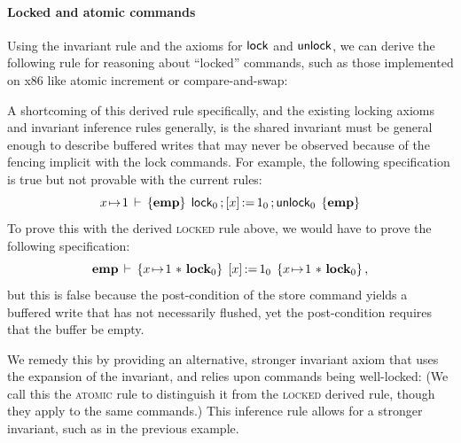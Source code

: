 \documentclass[11pt]{report}         %
\begin{document}


\paragraph{Locked and atomic commands} Using the invariant rule and the axioms for $\operatorname{\mathsf{lock}}$ and $\operatorname{\mathsf{unlock}}$, we can derive the following rule for reasoning about ``locked'' commands, such as those implemented on x86 like atomic increment or compare-and-swap:  

A shortcoming of this derived rule specifically, and the existing locking axioms and invariant inference rules generally, is the shared invariant must be general enough to describe buffered writes that may never be observed because of the fencing implicit with the lock commands. For example, the following specification is true but not provable with the current rules:     \[ x \!\mapsto\! 1\,\vdash\,\left\lbrace \mathbf{emp} \right\rbrace\;\operatorname{\mathsf{lock}}_0 \operatorname{;} \left[ x \right] \operatorname{:\!=} 1_0 \operatorname{;} \operatorname{\mathsf{unlock}}_0\;\left\lbrace \mathbf{emp} \right\rbrace \] To prove this with the derived \textsc{locked} rule above, we would have to prove the following specification: \[ \mathbf{emp}\,\vdash\,\left\lbrace x \!\mapsto\! 1 \operatorname{\,\ast\,} \mathbf{lock}_{0} \right\rbrace\;\left[ x \right] \operatorname{:\!=} 1_0\;\left\lbrace x \!\mapsto\! 1 \operatorname{\,\ast\,} \mathbf{lock}_{0} \right\rbrace,\] but this is false because the post-condition of the store command yields a buffered write that has not necessarily flushed, yet the post-condition requires that the buffer be empty. 

We remedy this by providing an alternative, stronger invariant axiom that uses the expansion of the invariant, and relies upon commands being well-locked:  (We call this the \textsc{atomic} rule to distinguish it from the \textsc{locked} derived rule, though they apply to the same commands.) This inference rule allows for a stronger invariant, such as in the previous example.
\end{document}
